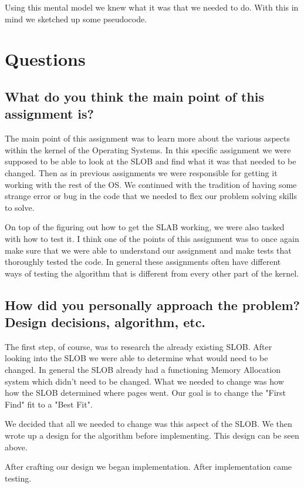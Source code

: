 \documentclass[letterpaper,10pt,titlepage]{article}
\begin{document}
Using this mental model we knew what it was that we needed to do.
With this in mind we sketched up some pseudocode.




\section{Questions}
\subsection{What do you think the main point of this assignment is?}

 \sloppy The main point of this assignment was to learn more about the various aspects within the kernel of the Operating Systems.
 In this specific assignment we were supposed to be able to look at the SLOB and find what it was that needed to be changed.
 Then as in previous assignments we were responsible for getting it working with the rest of the OS.
 We continued with the tradition of having some strange error or bug in the code that we needed to flex our problem solving skills to solve.

\sloppy On top of the figuring out how to get the SLAB working, we were also tasked with how to test it.
I think one of the points of this assignment was to once again make sure that we were able to understand our assignment and make tests that thoroughly tested the code.
In general these assignments often have different ways of testing the algorithm that is different from every other part of the kernel.

\subsection{How did you personally approach the problem? Design decisions, algorithm, etc.}

\sloppy The first step, of course, was to research the already existing SLOB. 
After looking into the SLOB we were able to determine what would need to be changed. 
In general the SLOB already had a functioning Memory Allocation system which didn't need to be changed. 
What we needed to change was how how the SLOB determined where pages went. Our goal is to change the "First Find" fit to a "Best Fit".

\sloppy We decided that all we needed to change was this aspect of the SLOB. 
We then wrote up a design for the algorithm before implementing.
This design can be seen above.

\sloppy After crafting our design we began implementation.
After implementation came testing.
\end{document}
